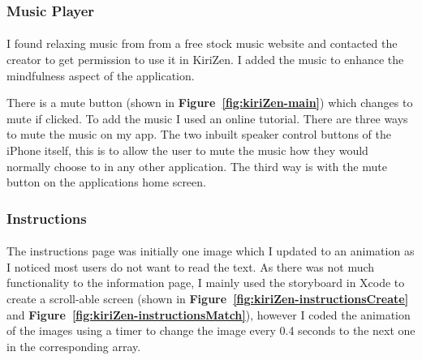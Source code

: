 \documentclass[11pt]{article}
\begin{document}
             \subsubsection{Music Player}
                         \paragraph{}

                I found relaxing music from from a free stock music website %
                and contacted the creator to get permission to use it in KiriZen. I added the music to enhance the mindfulness aspect of the application.
                
                There is a mute button (shown in \textbf{Figure~\ref{fig:kiriZen-main}}) which changes to mute if clicked. To add the music I used an online tutorial. %
                There are three ways to mute the music on my app. The two inbuilt speaker control buttons of the iPhone itself, this is to allow the user to mute the music how they would normally choose to in any other application. The third way is with the mute button on the applications home screen.
                
        \subsubsection{Instructions}
            
                \paragraph{}
                    The instructions page was initially one image which I updated to an animation as I noticed most users do not want to read the text.
                    As there was not much functionality to the information page, I mainly used the storyboard in Xcode to create a scroll-able screen (shown in \textbf{Figure~\ref{fig:kiriZen-instructionsCreate}} and \textbf{Figure~\ref{fig:kiriZen-instructionsMatch}}), however I coded the animation of the images using a timer to change the image every 0.4 seconds to the next one in the corresponding array. 
           
\end{document}
